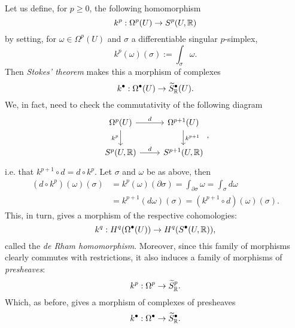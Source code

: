 \begin{rem}
	Let us define, for $p \geq 0$, the following homomorphism
	\begin{equation}
		k^p: \Omega^p(U) \to S^p(U,\mathbb{R})
	\end{equation} 
	by setting, for $\omega \in \Omega^p(U)$ and $\sigma$ a differentiable singular $p$-simplex,
	\begin{equation}
		k^p(\omega)(\sigma) := \int_{\sigma}^{} \omega 
	.\end{equation} 
	Then \textit{Stokes' theorem} makes this a morphism of complexes
	\begin{equation}
		k^\bullet: \Omega^\bullet(U) \to \widetilde{S}^\bullet_{\mathbb{R}}(U)
	.\end{equation} 
	We, in fact, need to check the commutativity of the following diagram
	\begin{equation}
	\begin{tikzcd}
		\Omega^p(U) \arrow[r, "d", rightarrow] \arrow[d, "k^p"', rightarrow] & \Omega^{p+1}(U) \arrow[d, "k^{p+1}", rightarrow] \\
		S^p(U,\R) \arrow[r, "d", rightarrow] & S^{p+1}(U,\R)
	\end{tikzcd}
	,\end{equation} 
	i.e. that $k^{p+1} \circ d = d \circ k^p$.
	Let $\sigma$ and $\omega$ be as above, then
	\begin{align}
		(d \circ k^p)(\omega) (\sigma) &= k^p(\omega) (\partial\sigma) = 
		\int_{\partial\sigma}^{} \omega 
		= \int_{\sigma}^{} d\omega \\
		&= k^{p+1}(d\omega) (\sigma) = (k^{p+1} \circ d) (\omega) (\sigma)
	.\end{align} 
	This, in turn, gives a morphism of the respective cohomologies:
	\begin{equation}
		k^q: H^q(\Omega^\bullet(U)) \to H^q(S^\bullet(U,\mathbb{R}))
	,\end{equation} 
	called the \textit{de Rham homomorphism}.
	Moreover, since this family of morphisms clearly commutes with restrictions, it also induces a family of morphisms of \textit{presheaves}:
	\begin{equation}
		k^p: \Omega^p \to \widetilde{S}^p_{\mathbb{R}}
	.\end{equation} 
	Which, as before, gives a morphism of complexes of presheaves
	\begin{equation}
		k^\bullet: \Omega^\bullet \to \widetilde{S}^\bullet_{\mathbb{R}}
	.\end{equation} 
\end{rem}

